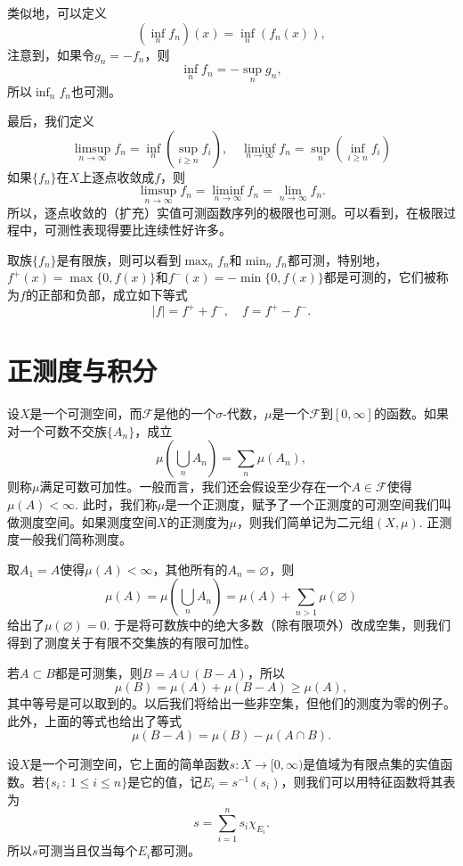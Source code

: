 类似地，可以定义
\[
	\left(\inf_n f_n\right)(x)=\inf_n (f_n(x)),
\]
注意到，如果令$g_n=-f_n$，则
\[
	\inf_n f_n=-\sup_n g_n,
\]
所以$\inf_n f_n$也可测。

最后，我们定义
\[
	\limsup_{n\to \infty}f_n=\inf_n \left(\sup_{i\geq n}f_i\right),\quad \liminf_{n\to \infty}f_n=\sup_n \left(\inf_{i\geq n}f_i\right)
\]
如果$\{f_n\}$在$X$上逐点收敛成$f$，则
\[
	\limsup_{n\to \infty}f_n= \liminf_{n\to \infty}f_n=\lim_{n\to\infty}f_n.
\]
所以，逐点收敛的（扩充）实值可测函数序列的极限也可测。可以看到，在极限过程中，可测性表现得要比连续性好许多。

取族$\{f_n\}$是有限族，则可以看到$\max_n f_n$和$\min_n f_n$都可测，特别地，$f^+(x)=\max\{0,f(x)\}$和$f^-(x)=-\min\{0,f(x)\}$都是可测的，它们被称为$f$的正部和负部，成立如下等式
\[
	|f|=f^++f^-,\quad f=f^+-f^-.
\]

\section{正测度与积分}

\begin{para}
设$X$是一个可测空间，而$\mathcal{F}$是他的一个$\sigma$-代数，$\mu$是一个$\mathcal{F}$到$[0,\infty]$的函数。如果对一个可数不交族$\{A_n\}$，成立
\[
	\mu\left(\bigcup_n A_n\right)=\sum_{n}\mu(A_n),
\]
则称$\mu$满足可数可加性。一般而言，我们还会假设至少存在一个$A\in \mathcal{F}$使得$\mu(A)<\infty$. 此时，我们称$\mu$是一个正测度，赋予了一个正测度的可测空间我们叫做测度空间。如果测度空间$X$的正测度为$\mu$，则我们简单记为二元组$(X,\mu)$. 正测度一般我们简称测度。
\end{para}

取$A_1=A$使得$\mu(A)<\infty$，其他所有的$A_n=\varnothing$，则
\[
	\mu(A)=\mu\left(\bigcup_n A_n\right)=\mu(A)+\sum_{n>1}\mu(\varnothing)
\]
给出了$\mu(\varnothing)=0$. 于是将可数族中的绝大多数（除有限项外）改成空集，则我们得到了测度关于有限不交集族的有限可加性。

若$A\subset B$都是可测集，则$B=A\cup (B-A)$，所以
\[
	\mu(B)=\mu(A)+\mu(B-A)\geq \mu(A),
\]
其中等号是可以取到的。以后我们将给出一些非空集，但他们的测度为零的例子。此外，上面的等式也给出了等式
\[
	\mu(B-A)=\mu(B)-\mu(A\cap B).
\]

\begin{para}
设$X$是一个可测空间，它上面的简单函数$s:X\to [0,\infty)$是值域为有限点集的实值函数。若$\{s_i\,:\,1\leq i\leq n\}$是它的值，记$E_i=s^{-1}(s_i)$，则我们可以用特征函数将其表为
\[
	s=\sum_{i=1}^n s_i \chi_{E_i}.
\]
所以$s$可测当且仅当每个$E_i$都可测。
\end{para}

